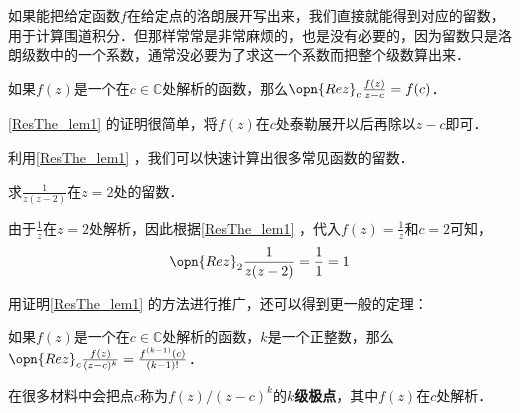 如果能把给定函数$f$在给定点的洛朗展开写出来，我们直接就能得到对应的留数，用于计算围道积分．但那样常常是非常麻烦的，也是没有必要的，因为留数只是洛朗级数中的一个系数，通常没必要为了求这一个系数而把整个级数算出来．

\begin{lemma}{}\label{ResThe_lem1}
如果$f(z)$是一个在$c\in\mathbb{C}$处解析的函数，那么$\opn{Rez}_c\frac{f(z)}{z-c}=f(c)$．
\end{lemma}

\autoref{ResThe_lem1} 的证明很简单，将$f(z)$在$c$处泰勒展开以后再除以$z-c$即可．

利用\autoref{ResThe_lem1} ，我们可以快速计算出很多常见函数的留数．

\begin{example}{}
求$\frac{1}{z(z-2)}$在$z=2$处的留数．

由于$\frac{1}{z}$在$z=2$处解析，因此根据\autoref{ResThe_lem1} ，代入$f(z)=\frac{1}{z}$和$c=2$可知，
\begin{equation}
\opn{Rez}_2\frac{1}{z(z-2)}=\frac{1}{1}=1
\end{equation}
\end{example}

用证明\autoref{ResThe_lem1} 的方法进行推广，还可以得到更一般的定理：

\begin{theorem}{}
如果$f(z)$是一个在$c\in\mathbb{C}$处解析的函数，$k$是一个正整数，那么$\opn{Rez}_c\frac{f(z)}{(z-c)^k}=\frac{f^{(k-1)}(c)}{(k-1)!}$．
\end{theorem}

在很多材料中会把点$c$称为$f(z)/(z-c)^k$的$k$\textbf{级极点}，其中$f(z)$在$c$处解析．














